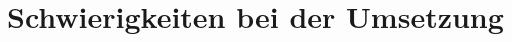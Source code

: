 \documentclass[../main/thesis.tex]{subfiles}
\begin{document}
\section{Schwierigkeiten bei der Umsetzung}
\label{ch:impl-difficulties}

\end{document}
